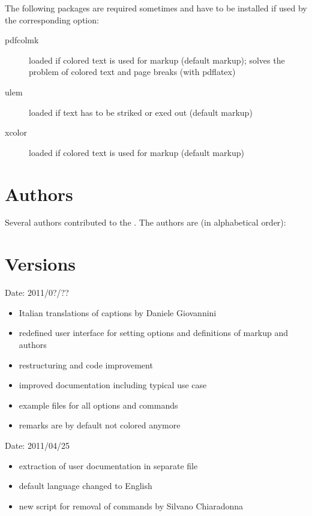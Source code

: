 The following packages are required sometimes and have to be installed if used by the corresponding option:
\begin{description}
	\item [pdfcolmk] loaded if colored text is used for markup (default markup); solves the problem of colored text and page breaks (with pdflatex)
	\item [ulem] loaded if text has to be striked or exed out (default markup)
	\item [xcolor] loaded if colored text is used for markup (default markup)
\end{description}


\section{Authors}
\label{sec:authors}

Several authors contributed to the .
The authors are (in alphabetical order):



\section{Versions}
\label{sec:versions}


Date: 2011/0?/??
\begin{itemize}
	\item Italian translations of captions by Daniele Giovannini
	\item redefined user interface for setting options and definitions of markup and authors
	\item restructuring and code improvement
	\item improved documentation including typical use case
	\item example files for all options and commands
	\item remarks are by default not colored anymore
\end{itemize}


Date: 2011/04/25
\begin{itemize}
	\item extraction of user documentation in separate file
	\item default language changed to English
	\item new script for removal of  commands by Silvano Chiaradonna
\end{itemize}

